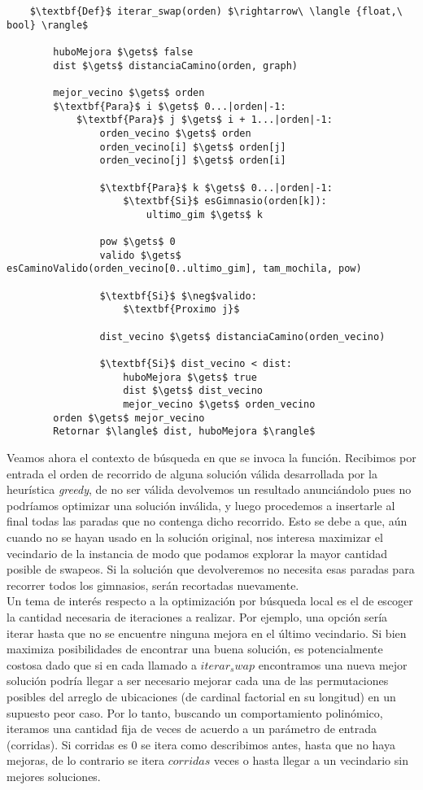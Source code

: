     \begin{lstlisting}
    $\textbf{Def}$ iterar_swap(orden) $\rightarrow\ \langle {float,\ bool} \rangle$

        huboMejora $\gets$ false
        dist $\gets$ distanciaCamino(orden, graph)

        mejor_vecino $\gets$ orden
        $\textbf{Para}$ i $\gets$ 0...|orden|-1:
            $\textbf{Para}$ j $\gets$ i + 1...|orden|-1:
                orden_vecino $\gets$ orden
                orden_vecino[i] $\gets$ orden[j]
                orden_vecino[j] $\gets$ orden[i]

                $\textbf{Para}$ k $\gets$ 0...|orden|-1:
                    $\textbf{Si}$ esGimnasio(orden[k]):
                        ultimo_gim $\gets$ k

                pow $\gets$ 0
                valido $\gets$ esCaminoValido(orden_vecino[0..ultimo_gim], tam_mochila, pow)

                $\textbf{Si}$ $\neg$valido:
                    $\textbf{Proximo j}$

                dist_vecino $\gets$ distanciaCamino(orden_vecino)

                $\textbf{Si}$ dist_vecino < dist:
                    huboMejora $\gets$ true
                    dist $\gets$ dist_vecino
                    mejor_vecino $\gets$ orden_vecino
        orden $\gets$ mejor_vecino
        Retornar $\langle$ dist, huboMejora $\rangle$
    \end{lstlisting}

    Veamos ahora el contexto de búsqueda en que se invoca la función. Recibimos por entrada el orden de recorrido de alguna solución válida desarrollada por la heurística \emph{greedy}, de no ser válida devolvemos un resultado anunciándolo pues no podríamos optimizar una solución inválida, y luego procedemos a insertarle al final todas las paradas que no contenga dicho recorrido. Esto se debe a que, aún cuando no se hayan usado en la solución original, nos interesa maximizar el vecindario de la instancia de modo que podamos explorar la mayor cantidad posible de swapeos. Si la solución que devolveremos no necesita esas paradas para recorrer todos los gimnasios, serán recortadas nuevamente.
    \\

    Un tema de interés respecto a la optimización por búsqueda local es el de escoger la cantidad necesaria de iteraciones a realizar. Por ejemplo, una opción sería iterar hasta que no se encuentre ninguna mejora en el último vecindario. Si bien maximiza posibilidades de encontrar una buena solución, es potencialmente costosa dado que si en cada llamado a $iterar_swap$ encontramos una nueva mejor solución podría llegar a ser necesario mejorar cada una de las permutaciones posibles del arreglo de ubicaciones (de cardinal factorial en su longitud) en un supuesto peor caso. Por lo tanto, buscando un comportamiento polinómico, iteramos una cantidad fija de veces de acuerdo a un parámetro de entrada (corridas). Si corridas es 0 se itera como describimos antes, hasta que no haya mejoras, de lo contrario se itera $corridas$ veces o hasta llegar a un vecindario sin mejores soluciones.

